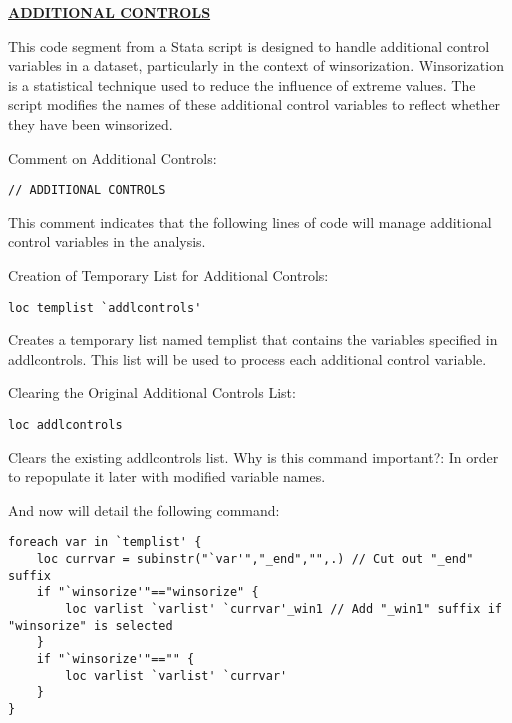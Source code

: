 \documentclass{article}
\begin{document}
\vspace{0.5cm}\underline{\textbf{ADDITIONAL CONTROLS}}

\vspace{0.2cm}This code segment from a Stata script is designed to handle additional control variables in a dataset, particularly in the context of winsorization. Winsorization is a statistical technique used to reduce the influence of extreme values. The script modifies the names of these additional control variables to reflect whether they have been winsorized. \newline

Comment on Additional Controls:

\begin{mdframed}
\begin{verbatim}
// ADDITIONAL CONTROLS
\end{verbatim}
\end{mdframed}

This comment indicates that the following lines of code will manage additional control variables in the analysis. \newline

Creation of Temporary List for Additional Controls:
\begin{mdframed}
\begin{verbatim}
loc templist `addlcontrols'
\end{verbatim}
\end{mdframed}


Creates a temporary list named templist that contains the variables specified in addlcontrols. This list will be used to process each additional control variable.\newline

Clearing the Original Additional Controls List:
\begin{mdframed}
\begin{verbatim}
loc addlcontrols
\end{verbatim}
\end{mdframed}

Clears the existing addlcontrols list. 
Why is this command important?: In order to repopulate it later with modified variable names. \newline

And now will detail the following command: 
\begin{mdframed}
\begin{verbatim}
foreach var in `templist' {
	loc currvar = subinstr("`var'","_end","",.) // Cut out "_end" suffix 
	if "`winsorize'"=="winsorize" {
		loc varlist `varlist' `currvar'_win1 // Add "_win1" suffix if "winsorize" is selected
	}
	if "`winsorize'"=="" {
		loc varlist `varlist' `currvar'
	}
}
\end{verbatim}
\end{mdframed}
\end{document}
